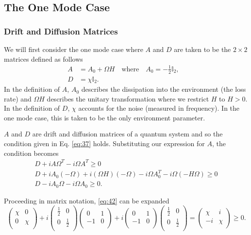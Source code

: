 \documentclass[11pt,a4paper]{article}
\numberwithin{equation}{section}
\begin{document}
	\subsection{The One Mode Case}
	\label{sec:onemode}
	\subsubsection{Drift and Diffusion Matrices}
	\label{sec:onemodedefs}
	We will first consider the one mode case where $A$ and $D$ are taken to be the $2 \times 2$ matrices defined as follows
	\begin{align*}
	A &= A_0 + \Omega H \quad\text{where}\quad A_0 = -\frac{1}{2}\mathbb{I}_2,&\\
	D &= \chi \mathbb{I}_2.&
	\end{align*}
	In the definition of $A$, $A_0$ describes the dissipation into the environment (the loss rate) and $\Omega H$ describes the unitary transformation where we restrict $H$ to $H>0$. In the definition of $D$, $\chi$ accounts for the noise (measured in frequency). In the one mode case, this is taken to be the only environment parameter. 
	
	$A$ and $D$ are drift and diffusion matrices of a quantum system and so the condition given in Eq. \ref{eq:37} holds. Substituting our expression for $A$, the condition becomes
	\begin{align} 
	&D + iA \Omega^T - i\Omega A^T \geq 0& \nonumber\\
	&D + iA_0 (-\Omega) + i (\Omega H) (-\Omega) - i\Omega A_{0}^{T} - i\Omega (-H\Omega) \geq 0& \nonumber\\
	&D - iA_0 \Omega - i\Omega A_0 \geq 0.& \label{eq:42}
	\end{align}
	
	Proceeding in matrix notation, \ref{eq:42} can be expanded	
	\begin{equation*}
	\begin{pmatrix}
	\chi & 0  \\
	0 & \chi \\
	\end{pmatrix} + i\begin{pmatrix}
	\frac{1}{2} & 0  \\
	0 & \frac{1}{2} \\
	\end{pmatrix}\begin{pmatrix}
	0 & 1  \\
	-1 & 0 \\
	\end{pmatrix} + i\begin{pmatrix}
	0 & 1  \\
	-1 & 0 \\
	\end{pmatrix}\begin{pmatrix}
	\frac{1}{2} & 0  \\
	0 & \frac{1}{2} \\
	\end{pmatrix}=
	\begin{pmatrix}
	\chi & i  \\
	-i & \chi \\
	\end{pmatrix} \geq 0.
	\end{equation*}
\end{document}
